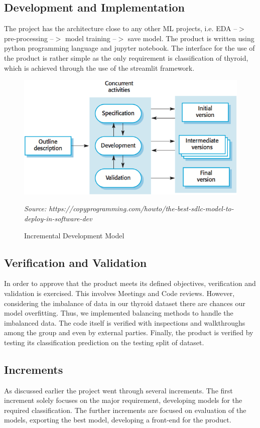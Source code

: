 \subsection{Development and Implementation}
The project has the architecture close to any other ML projects, i.e. EDA --$>$ pre-processing --$>$ model training --$>$ save model. The product is written using python programming language and jupyter notebook. The interface for the use of the product is rather simple as the only requirement is classification of thyroid, which is achieved through the use of the streamlit framework.
\begin{figure}[h]
\centering
\includegraphics[scale=1]{incremental.png}
\caption{Incremental Development Model}
\textit{Source: https://copyprogramming.com/howto/the-best-sdlc-model-to-deploy-in-software-dev}
\end{figure}
\subsection{Verification and Validation}
In order to approve that the product meets its defined objectives, verification and validation is exercised. This involves Meetings and Code reviews. However, considering the imbalance of data in our thyroid dataset there are chances our model overfitting. Thus, we implemented balancing methods to handle the imbalanced data. 
The code itself is verified with inspections and walkthroughs among the group and even by external parties. Finally, the product is verified by testing its classification prediction on the testing split of dataset.
\subsection{Increments}
As discussed earlier the project went through several increments. The first increment solely focuses on the major requirement, developing models for the required classification. The further increments are focused on evaluation of the models, exporting the best model, developing a front-end for the product.

